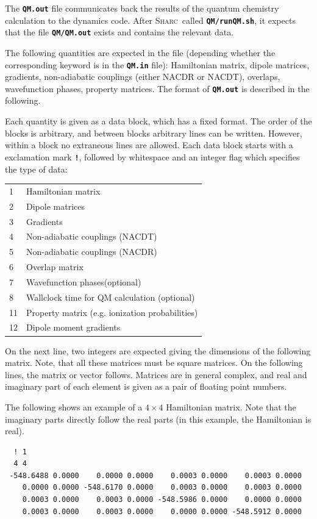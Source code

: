 \documentclass[a4paper,11pt,DIV=15,openany,twoside=false]{scrbook}
\newcommand{\sharc}{\textsc{Sharc}}
\newcommand{\ttt}[1]{\textbf{\texttt{#1}}}
\newenvironment{example}{
  \vspace{0mm}
  \definecolor{shadecolor}{HTML}{E4F4FF}
  \begin{shaded}
}{
  \end{shaded}
}
\begin{document}
The \ttt{QM.out} file communicates back the results of the quantum chemistry calculation to the dynamics code. After \sharc\ called \ttt{QM/runQM.sh}, it expects that the file \ttt{QM/QM.out} exists and contains the relevant data.

The following quantities are expected in the file (depending whether the corresponding keyword is in the \ttt{QM.in} file): Hamiltonian matrix, dipole matrices, gradients, non-adiabatic couplings (either NACDR or NACDT), overlaps, wavefunction phases, property matrices. The format of \ttt{QM.out} is described in the following. 

Each quantity is given as a data block, which has a fixed format. The order of the blocks is arbitrary, and between blocks arbitrary lines can be written. However, within a block no extraneous lines are allowed. Each data block starts with a exclamation mark \ttt{!}, followed by whitespace and an integer flag which specifies the type of data:

\begin{tabular}{ll}
1       &Hamiltonian matrix\\
2       &Dipole matrices\\
3       &Gradients\\
4       &Non-adiabatic couplings (NACDT)\\
5       &Non-adiabatic couplings (NACDR)\\
6       &Overlap matrix\\
7       &Wavefunction phases(optional)\\
8       &Wallclock time for QM calculation (optional)\\
11      &Property matrix (e.g. ionization probabilities)\\
12      &Dipole moment gradients\\
\end{tabular}

On the next line, two integers are expected giving the dimensions of the following matrix. Note, that all these matrices must be square matrices. On the following lines, the matrix or vector follows. Matrices are in general complex, and real and imaginary part of each element is given as a pair of floating point numbers.

The following shows an example of a $4\times 4$ Hamiltonian matrix. Note that the imaginary parts directly follow the real parts (in this example, the Hamiltonian is real).
\begin{example}
  \begin{verbatim}
  ! 1
  4 4
 -548.6488 0.0000    0.0000 0.0000    0.0003 0.0000    0.0003 0.0000
    0.0000 0.0000 -548.6170 0.0000    0.0003 0.0000    0.0003 0.0000
    0.0003 0.0000    0.0003 0.0000 -548.5986 0.0000    0.0000 0.0000
    0.0003 0.0000    0.0003 0.0000    0.0000 0.0000 -548.5912 0.0000
  \end{verbatim}
\end{example}
\end{document}
